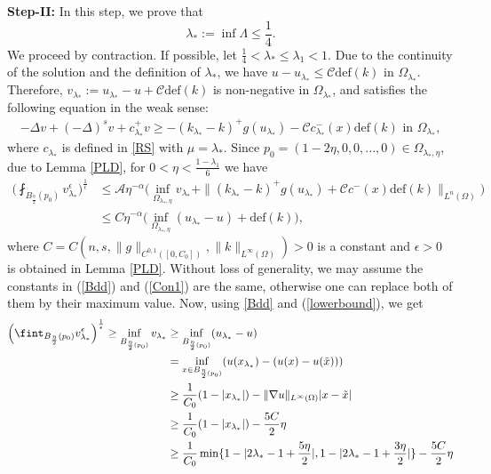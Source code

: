\documentclass[11pt, notitlepage]{article}
\newcommand{\De} {\Delta}
\newcommand{\la} {\lambda}
\begin{document}
{\textbf{Step-II:} In this step, we prove that $$\lambda_*:=\inf \Lambda\leq \frac{1}{4}.$$ We proceed by contraction. If possible, let $\frac{1}{4}<\lambda_*\leq \lambda_1<1$.
Due to the continuity of the solution and the definition of $\lambda_*$, we have $u-u_{\lambda_*}\leq \mathcal{C}\mathrm{def}(k)$ in $\Omega_{\lambda_*}$. Therefore, $v_{\lambda_*}:=u_{\lambda_*}-u+\mathcal{C}\mathrm{def}(k)$ is non-negative in $\Omega_{\lambda_*}$, and satisfies the following equation in the weak sense:
\begin{align*}
    -\De v+(-\De)^sv+c_{\la_*}^+v\geq-(k_{\lambda_*}-k)^+g(u_{\lambda_*})-\mathcal{C}c_{\lambda_*}^-(x)\mathrm{def}(k)\text{ in }\Omega_{\lambda_*},
\end{align*}
where $c_{\lambda_*}$ is defined in \eqref{RS} with $\mu=\lambda_*$. Since $p_0=(1-2\eta,0,0,...,0)\in \Omega_{\lambda_*,\eta}$, due to Lemma \ref{PLD}, for $0<\eta<\frac{1-\lambda_1}{6}$ we have
\begin{align}\label{Con1}
    \Big(\fint_{B_{\frac{\eta}{2}}(p_0)}v_{\lambda_*}^\epsilon\Big)^\frac{1}{\epsilon}&\leq \mathcal{A}\eta^{-\alpha}\Big(\inf_{\Omega_{\lambda_*,\eta}}v_{\lambda_*}+\|(k_{\lambda_*}-k)^+g(u_{\lambda_*})+\mathcal{C}c^-(x)\mathrm{def}(k)\|_{L^n(\Omega)}\Big)\nonumber\\
    &\leq C\eta^{-\alpha}\Big(\inf_{\Omega_{\lambda_*,\eta}}(u_{\lambda_*}-u)+\mathrm{def}(k)\Big),
\end{align}
where $C=C(n,s,\|g\|_{C^{0,1}([0,C_0])},\|k\|_{L^\infty(\Omega)})>0$ is a constant and $\epsilon>0$ is obtained in Lemma \ref{PLD}. Without loss of generality, we may assume the constants in (\ref{Bdd}) and (\ref{Con1}) are the same, otherwise one can replace both of them by their maximum value. Now, using \eqref{Bdd} and (\ref{lowerbound}), we get
\begin{align}\label{Sreeja1}
    \Big(\fint_{B_{\frac{\eta}{2}}(p_0)}v_{\lambda_*}^\epsilon\Big)^\frac{1}{\epsilon}\geq \inf_{B_{\frac{\eta}{2}(p_0)}}v_{\lambda_*}&\geq \inf_{B_{\frac{\eta}{2}(p_0)}} (u_{\lambda_*}-u)\nonumber\\
    &=\inf_{x\in B_{\frac{\eta}{2}(p_0)}} (u(x_{\lambda_*})-(u(x)-u(\Tilde{x})))\nonumber\\
    &\geq \frac{1}{C_0}(1-|x_{\lambda_*}|)-\|\nabla u\|_{L^\infty(\Omega)}|x-\Tilde{x}|\nonumber\\
    &\geq \frac{1}{C_0}(1-|x_{\lambda_*}|)-\frac{5C}{2}\eta\nonumber\\
    &\geq \frac{1}{C_0} \min\{{ 1-|2\lambda_*-1+\frac{5\eta}{2}|, 1-|2\lambda_*-1+\frac{3\eta}{2}|\}}-\frac{5C}{2}\eta\nonumber\\

\end{align}}
\end{document}
